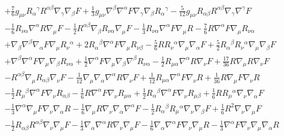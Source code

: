 \documentclass[10pt,letterpaper]{article}
\numberwithin{equation}{section}
\begin{document}
\begin{eqnarray}
&& + \tfrac{7}{6} g_{\mu \nu } R_{\alpha }{}^{\gamma } R^{\alpha \beta } \nabla_{\gamma }\nabla_{\beta }F + \tfrac{1}{3} g_{\mu \nu } \nabla^{\beta }\nabla^{\alpha }F \nabla_{\gamma }\nabla_{\beta }R_{\alpha }{}^{\gamma } -  \tfrac{5}{12} g_{\mu \nu } R_{\alpha \beta } R^{\alpha \beta } \nabla_{\gamma }\nabla^{\gamma }F \nonumber \\ 
&& -  \tfrac{1}{6} R_{\nu \alpha } \nabla^{\alpha }R \nabla_{\mu }F -  \tfrac{1}{2} R^{\alpha \beta } \nabla_{\beta }R_{\nu \alpha } \nabla_{\mu }F -  \tfrac{1}{3} R_{\nu \alpha } \nabla^{\alpha }F \nabla_{\mu }R -  \tfrac{7}{6} R \nabla^{\alpha }F \nabla_{\mu }R_{\nu \alpha } \nonumber \\ 
&& + \nabla_{\beta }\nabla^{\beta }\nabla_{\alpha }F \nabla_{\mu }R_{\nu }{}^{\alpha } + 2 R_{\alpha }{}^{\beta } \nabla^{\alpha }F \nabla_{\mu }R_{\nu \beta } -  \tfrac{5}{6} R R_{\nu }{}^{\alpha } \nabla_{\mu }\nabla_{\alpha }F + \tfrac{5}{2} R_{\alpha }{}^{\beta } R_{\nu }{}^{\alpha } \nabla_{\mu }\nabla_{\beta }F \nonumber \\ 
&& + \nabla^{\beta }\nabla^{\alpha }F \nabla_{\mu }\nabla_{\beta }R_{\nu \alpha } + \tfrac{1}{2} \nabla^{\alpha }F \nabla_{\mu }\nabla_{\beta }\nabla^{\beta }R_{\nu \alpha } -  \tfrac{1}{2} R_{\mu \alpha } \nabla^{\alpha }R \nabla_{\nu }F + \tfrac{17}{36} R \nabla_{\mu }R \nabla_{\nu }F \nonumber \\ 
&& -  R^{\alpha \beta } \nabla_{\mu }R_{\alpha \beta } \nabla_{\nu }F -  \tfrac{1}{12} \nabla_{\mu }\nabla_{\alpha }\nabla^{\alpha }R \nabla_{\nu }F + \tfrac{1}{12} R_{\mu \alpha } \nabla^{\alpha }F \nabla_{\nu }R + \tfrac{1}{36} R \nabla_{\mu }F \nabla_{\nu }R \nonumber \\ 
&& -  \tfrac{1}{2} R_{\mu }{}^{\beta } \nabla^{\alpha }F \nabla_{\nu }R_{\alpha \beta } -  \tfrac{1}{6} R \nabla^{\alpha }F \nabla_{\nu }R_{\mu \alpha } + \tfrac{1}{2} R_{\alpha }{}^{\beta } \nabla^{\alpha }F \nabla_{\nu }R_{\mu \beta } + \tfrac{1}{6} R R_{\mu }{}^{\alpha } \nabla_{\nu }\nabla_{\alpha }F \nonumber \\ 
&& -  \tfrac{1}{3} \nabla^{\alpha }\nabla_{\mu }F \nabla_{\nu }\nabla_{\alpha }R -  \tfrac{1}{6} \nabla_{\mu }R \nabla_{\nu }\nabla_{\alpha }\nabla^{\alpha }F -  \tfrac{1}{2} R_{\alpha }{}^{\beta } R_{\mu }{}^{\alpha } \nabla_{\nu }\nabla_{\beta }F + \tfrac{1}{6} R^2 \nabla_{\nu }\nabla_{\mu }F \nonumber \\ 
&& -  \tfrac{1}{2} R_{\alpha \beta } R^{\alpha \beta } \nabla_{\nu }\nabla_{\mu }F -  \tfrac{1}{3} \nabla_{\alpha }\nabla^{\alpha }R \nabla_{\nu }\nabla_{\mu }F -  \tfrac{1}{6} \nabla_{\alpha }\nabla^{\alpha }F \nabla_{\nu }\nabla_{\mu }R -  \tfrac{1}{3} \nabla^{\alpha }F \nabla_{\nu }\nabla_{\mu }\nabla_{\alpha }R

\end{eqnarray}
\end{document}
